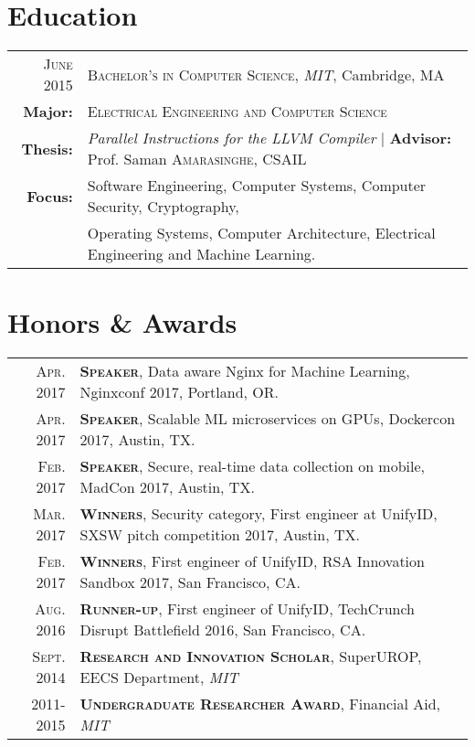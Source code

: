 \documentclass[lettersize,10pt]{article}
\begin{document}
\section{Education}
\begin{tabular}{rl}
\textsc{June} 2015 & \textsc{Bachelor's in Computer Science}, \emph{MIT}, Cambridge, MA\\
\textbf{Major:} & \textsc{Electrical Engineering and Computer Science}\\
\textbf{Thesis:} & \emph{Parallel Instructions for the LLVM Compiler} | \textbf{Advisor:} Prof. Saman \textsc{Amarasinghe}, CSAIL\\
\textbf{Focus:} &  Software Engineering, Computer Systems, Computer Security, Cryptography, \\
& Operating Systems, Computer Architecture, Electrical Engineering and Machine Learning.\\
\end{tabular}

\section{Honors \& Awards}
\begin{tabular}{rl}
    \textsc{Apr.} 2017 & \textsc{\textbf{Speaker}}, Data aware Nginx for Machine Learning, Nginxconf 2017, Portland, OR. \\
    \textsc{Apr.} 2017 & \textsc{\textbf{Speaker}}, Scalable ML microservices on GPUs, Dockercon 2017, Austin, TX. \\
    \textsc{Feb.} 2017 & \textsc{\textbf{Speaker}}, Secure, real-time data collection on mobile, MadCon 2017, Austin, TX. \\
    \textsc{Mar.} 2017 & \textsc{\textbf{Winners}}, Security category, First engineer at UnifyID, SXSW pitch competition 2017, Austin, TX. \\
    \textsc{Feb.} 2017 & \textsc{\textbf{Winners}}, First engineer of UnifyID, RSA Innovation Sandbox 2017, San Francisco, CA. \\
    \textsc{Aug.} 2016 & \textsc{\textbf{Runner-up}}, First engineer of UnifyID, TechCrunch Disrupt Battlefield 2016, San Francisco, CA. \\
    \textsc{Sept.} 2014 & \textsc{\textbf{Research and Innovation Scholar}}, SuperUROP, EECS Department, \emph{MIT}\\
    2011-2015 & \textsc{\textbf{Undergraduate Researcher Award}}, Financial Aid, \emph{MIT}\\
\end{tabular}
\end{document}

